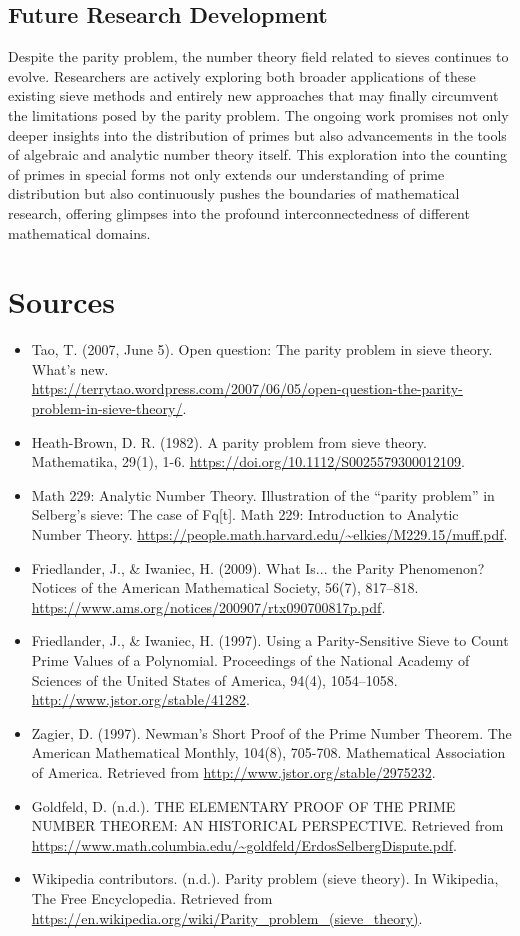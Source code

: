 \documentclass[10pt]{extarticle}
\begin{document}
\subsection{Future Research Development}
Despite the parity problem, the number theory field related to sieves continues to evolve. 
Researchers are actively exploring both broader applications of these existing sieve methods and entirely new approaches that may finally circumvent the limitations posed by the parity problem. 
The ongoing work promises not only deeper insights into the distribution of primes but also advancements in the tools of algebraic and analytic number theory itself.
This exploration into the counting of primes in special forms not only extends our understanding of prime distribution but also continuously pushes the boundaries of mathematical research, offering glimpses into the profound interconnectedness of different mathematical domains.



\section{Sources}
\begin{itemize}
  \item Tao, T. (2007, June 5). Open question: The parity problem in sieve theory. What's new.\\  \url{https://terrytao.wordpress.com/2007/06/05/open-question-the-parity-problem-in-sieve-theory/}.
  \item Heath-Brown, D. R. (1982). A parity problem from sieve theory. Mathematika, 29(1), 1-6. \url{https://doi.org/10.1112/S0025579300012109}.
  \item Math 229: Analytic Number Theory. Illustration of the “parity problem” in Selberg’s sieve: The case of Fq[t]. Math 229: Introduction to Analytic Number Theory. \url{https://people.math.harvard.edu/~elkies/M229.15/muff.pdf}.
  \item Friedlander, J., \& Iwaniec, H. (2009). What Is... the Parity Phenomenon? Notices of the American Mathematical Society, 56(7), 817–818. \url{https://www.ams.org/notices/200907/rtx090700817p.pdf}.
  \item Friedlander, J., \& Iwaniec, H. (1997). Using a Parity-Sensitive Sieve to Count Prime Values of a Polynomial. Proceedings of the National Academy of Sciences of the United States of America, 94(4), 1054–1058. \url{http://www.jstor.org/stable/41282}.
  \item Zagier, D. (1997). Newman's Short Proof of the Prime Number Theorem. The American Mathematical Monthly, 104(8), 705-708. Mathematical Association of America. Retrieved from \url{http://www.jstor.org/stable/2975232}.
  \item Goldfeld, D. (n.d.). THE ELEMENTARY PROOF OF THE PRIME NUMBER THEOREM: AN HISTORICAL PERSPECTIVE. Retrieved from \url{https://www.math.columbia.edu/~goldfeld/ErdosSelbergDispute.pdf}.
  \item Wikipedia contributors. (n.d.). Parity problem (sieve theory). In Wikipedia, The Free Encyclopedia. Retrieved from \url{https://en.wikipedia.org/wiki/Parity_problem_(sieve_theory)}.
  \end{itemize}
\end{document}
